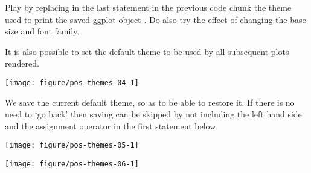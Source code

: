 \documentclass[krantz2]{krantz}\usepackage{knitr}%
\begin{document}
\begin{playground}
Play by replacing in the last statement in the previous code chunk the theme used to print the saved ggplot object . Do also try the effect of changing the base size and font family.
\end{playground}

It is also possible to set the default theme to be used by all subsequent plots rendered.

\begin{knitrout}\footnotesize
{}\color{fgcolor}\begin{kframe}
\begin{alltt}
\end{alltt}
\end{kframe}

{\centering \texttt{[image: figure/pos-themes-04-1]} 

}



\end{knitrout}

We save the current default theme, so as to be able to restore it. If there is no need to `go back' then saving can be skipped by not including the left hand side and the assignment operator in the first statement below.

\begin{knitrout}\footnotesize
{}\color{fgcolor}\begin{kframe}
\begin{alltt}
 \hlkwb{<-} \hlstd{(}\hlstd{(}\hlstd{))}
\end{alltt}
\end{kframe}

{\centering \texttt{[image: figure/pos-themes-05-1]} 

}



\end{knitrout}

\begin{knitrout}\footnotesize
{}\color{fgcolor}\begin{kframe}
\begin{alltt}
\end{alltt}
\end{kframe}

{\centering \texttt{[image: figure/pos-themes-06-1]} 

}



\end{knitrout}
\end{document}
